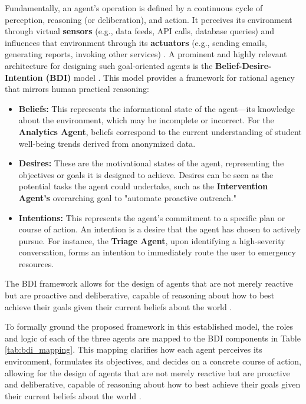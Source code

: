 Fundamentally, an agent's operation is defined by a continuous cycle of perception, reasoning (or deliberation), and action. It perceives its environment through virtual \textbf{sensors} (e.g., data feeds, API calls, database queries) and influences that environment through its \textbf{actuators} (e.g., sending emails, generating reports, invoking other services) \cite{FIND_CITATION_PLEASE}. A prominent and highly relevant architecture for designing such goal-oriented agents is the \textbf{Belief-Desire-Intention (BDI)} model \cite{FIND_CITATION_PLEASE}. This model provides a framework for rational agency that mirrors human practical reasoning:
\begin{itemize}
    \item \textbf{Beliefs:} This represents the informational state of the agent—its knowledge about the environment, which may be incomplete or incorrect. For the \textbf{Analytics Agent}, beliefs correspond to the current understanding of student well-being trends derived from anonymized data.
    \item \textbf{Desires:} These are the motivational states of the agent, representing the objectives or goals it is designed to achieve. Desires can be seen as the potential tasks the agent could undertake, such as the \textbf{Intervention Agent's} overarching goal to "automate proactive outreach."
    \item \textbf{Intentions:} This represents the agent's commitment to a specific plan or course of action. An intention is a desire that the agent has chosen to actively pursue. For instance, the \textbf{Triage Agent}, upon identifying a high-severity conversation, forms an intention to immediately route the user to emergency resources.
\end{itemize}
The BDI framework allows for the design of agents that are not merely reactive but are proactive and deliberative, capable of reasoning about how to best achieve their goals given their current beliefs about the world \cite{FIND_CITATION_PLEASE}.

To formally ground the proposed framework in this established model, the roles and logic of each of the three agents are mapped to the BDI components in Table \ref{tab:bdi_mapping}. This mapping clarifies how each agent perceives its environment, formulates its objectives, and decides on a concrete course of action, allowing for the design of agents that are not merely reactive but are proactive and deliberative, capable of reasoning about how to best achieve their goals given their current beliefs about the world \cite{FIND_CITATION_PLEASE}.

